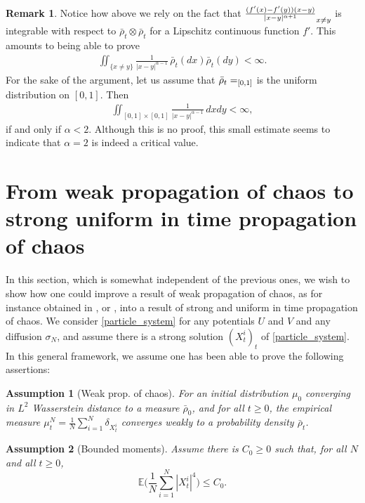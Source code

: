 \documentclass[11pt]{article}
\makeatletter
\DeclareRobustCommand{\mathbbm}[1]{\csname jepbb@#1\endcsname}
\let\mathds\mathbbm
\theoremstyle{plain}
\newtheorem{assumption}{Assumption}
\theoremstyle{definition}
\newtheorem{remark}{Remark}[section]
\makeatother
\begin{document}
\begin{remark}
Notice how above we rely on the fact that $\frac{(f'(x)-f'(y))(x-y)}{|x-y|^{\alpha+1}}\mathds{1}_{x\neq y}$ is integrable with respect to $\bar{\rho}_t\otimes\bar{\rho}_t$ for a Lipschitz continuous function $f'$. This amounts to being able to prove
\begin{align*}
\iint_{\{x\neq y\}}\frac{1}{|x-y|^{\alpha-1}}\,\bar{\rho}_t(dx)\bar{\rho}_t(dy)<\infty.
\end{align*}
For the sake of the argument, let us assume that $\bar{\rho}_t=\mathds{1}_{[0,1]}$ is the uniform distribution on $[0,1]$. Then
\begin{align*}
\iint_{[0,1]\times[0,1]}\frac{1}{|x-y|^{\alpha-1}}\,dxdy<\infty,
\end{align*}
if and only if $\alpha<2$. Although this is no proof, this small estimate seems to indicate that $\alpha=2$ is indeed a critical value.
\end{remark}

\section{From weak propagation of chaos to strong uniform in time propagation of chaos}\label{sec_from_weak_to_strong}

In this section, which is somewhat independent of the previous ones, we wish to show how one could improve a result of weak propagation of chaos, as for instance obtained in \cite{Rogers_Shi}, \cite{cepa_lepingle} or \cite{Li_Li_Xie}, into a result of strong and uniform in time propagation of chaos. We consider \eqref{particle_system} for any potentials $U$ and $V$ and any diffusion $\sigma_N$, and assume there is a strong solution $(X^i_t)_t$ of \eqref{particle_system}. In this general framework, we assume one has been able to prove the following assertions:

\begin{assumption}[Weak prop. of chaos]\label{Hyp_weak_prop}
For an initial distribution $\mu_0$ converging in $L^2$ Wasserstein distance to a measure $\bar{\rho}_0$, and for all $t\geq0$, the empirical measure ${\mu^N_t=\frac{1}{N}\sum_{i=1}^N\delta_{X^i_t}}$ converges weakly to a probability density $\bar{\rho}_t$.
\end{assumption}

\begin{assumption}[Bounded moments]\label{Hyp_bounded_moments}
Assume there is $C_0\geq0$ such that, for all $N$ and all $t\geq0$,
\[
\mathbb{E}\biggl(\frac{1}{N}\sum_{i=1}^N|X^i_t|^{4}\biggr)\leq C_0.
\]
\end{assumption}
\end{document}
